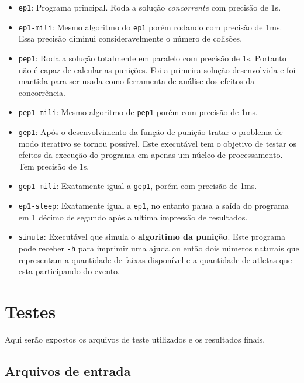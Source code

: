 \documentclass[12pt,a4paper]{article}
\begin{document}
\begin{itemize}
\item \verb+ep1+: Programa principal. Roda a solução \textit{concorrente} com precisão de 1s.
\item \verb+ep1-mili+: Mesmo algoritmo do \verb+ep1+ porém rodando com precisão de 1ms. Essa precisão diminui consideravelmente o número de colisões.
\item \verb+pep1+: Roda a solução totalmente em paralelo com precisão de 1s. Portanto não é capaz de calcular as punições. Foi a primeira solução desenvolvida e foi mantida para ser usada como ferramenta de análise dos efeitos da concorrência.
\item \verb+pep1-mili+: Mesmo algoritmo de \verb+pep1+ porém com precisão de 1ms.
\item \verb+gep1+: Após o desenvolvimento da função de punição tratar o problema de modo iterativo se tornou possível. Este executável tem o objetivo de testar os efeitos da execução do programa em apenas um núcleo de processamento. Tem precisão de 1s.
\item \verb+gep1-mili+: Exatamente igual a \verb+gep1+, porém com precisão de 1ms.
\item \verb+ep1-sleep+: Exatamente igual a \verb+ep1+, no entanto pausa a saída do programa em 1 décimo de segundo após a ultima impressão de resultados.
\item \verb+simula+: Executável que simula o \textbf{algoritimo da punição}. Este programa pode receber \verb+-h+ para imprimir uma ajuda ou então dois números naturais que representam a quantidade de faixas disponível e a quantidade de atletas que esta participando do evento.
\end{itemize}

\section{Testes}
Aqui serão expostos os arquivos de teste utilizados e os resultados finais.
\subsection{Arquivos de entrada}
\end{document}
